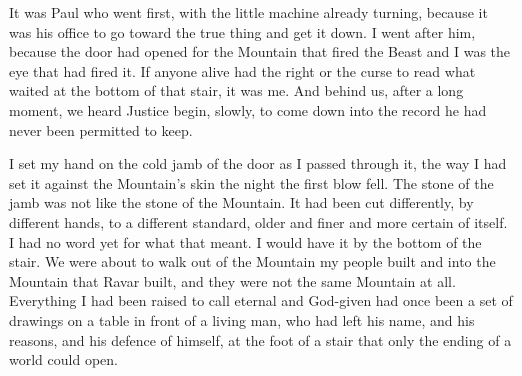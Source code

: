 It was Paul who went first, with the little machine already turning, because it was his office to go toward the true thing and get it down. I went after him, because the door had opened for the Mountain that fired the Beast and I was the eye that had fired it. If anyone alive had the right or the curse to read what waited at the bottom of that stair, it was me. And behind us, after a long moment, we heard Justice begin, slowly, to come down into the record he had never been permitted to keep.\par

I set my hand on the cold jamb of the door as I passed through it, the way I had set it against the Mountain's skin the night the first blow fell. The stone of the jamb was not like the stone of the Mountain. It had been cut differently, by different hands, to a different standard, older and finer and more certain of itself. I had no word yet for what that meant. I would have it by the bottom of the stair. We were about to walk out of the Mountain my people built and into the Mountain that Ravar built, and they were not the same Mountain at all. Everything I had been raised to call eternal and God-given had once been a set of drawings on a table in front of a living man, who had left his name, and his reasons, and his defence of himself, at the foot of a stair that only the ending of a world could open.\par
